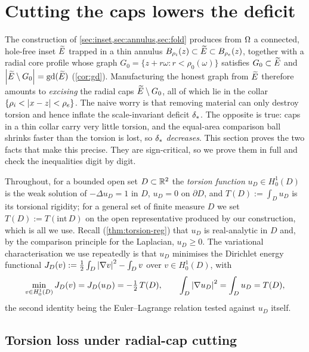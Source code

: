 \section{Cutting the caps lowers the deficit}
\label{sec:cut}

The construction of \cref{sec:inset,sec:annulus,sec:fold} produces from
$\Omega$ a connected, hole-free inset $\widetilde{E}$ trapped in a thin annulus
$B_{\rho_i}(z)\subset\widetilde{E}\subset B_{\rho_e}(z)$, together with a radial core
profile whose graph
$G_0=\{z+r\omega:r<\rho_0(\omega)\}$ satisfies $G_0\subset\widetilde{E}$ and
$\left\lvert\widetilde{E}\setminus G_0\right\rvert=\mathrm{gd}(\widetilde{E})$ (\cref{cor:gd}). Manufacturing the
honest graph from $\widetilde{E}$ therefore amounts to \emph{excising} the radial
caps $\widetilde{E}\setminus G_0$, all of which lie in the collar
$\{\rho_i<\left\lvert x-z\right\rvert<\rho_e\}$. The naive worry is that removing material can
only destroy torsion and hence inflate the scale-invariant deficit
$\delta_{*}$. The opposite is true: caps in a thin collar carry very little
torsion, and the equal-area comparison ball shrinks faster than the torsion
is lost, so $\delta_{*}$ \emph{decreases}. This section proves the two facts
that make this precise. They are sign-critical, so we prove them in full and
check the inequalities digit by digit.

Throughout, for a bounded open set $D\subset\mathbb{R}^2$ the \emph{torsion
function} $u_D\in H^1_0(D)$ is the weak solution of $-\Delta u_D=1$ in $D$,
$u_D=0$ on $\partial D$, and $T(D):=\int_D u_D$ is its torsional rigidity;
for a general set of finite measure $D$ we set $T(D):=T(\mathrm{int}\,D)$ on
the open representative produced by our construction, which is all we use.
Recall (\cref{thm:torsion-reg}) that $u_D$ is real-analytic in $D$ and, by
the comparison principle for the Laplacian, $u_D\ge0$. The variational
characterisation we use repeatedly is that $u_D$ minimises the Dirichlet
energy functional $J_D(v):=\tfrac12\int_D\left\lvert\nabla v\right\rvert^2-\int_D v$ over
$v\in H^1_0(D)$, with
\begin{equation}\label{eq:torsion-energy}
   \min_{v\in H^1_0(D)}J_D(v)=J_D(u_D)=-\tfrac12\,T(D),
   \qquad
   \int_D\left\lvert\nabla u_D\right\rvert^2=\int_D u_D=T(D),
\end{equation}
the second identity being the Euler--Lagrange relation tested against $u_D$
itself.

\subsection{Torsion loss under radial-cap cutting}

